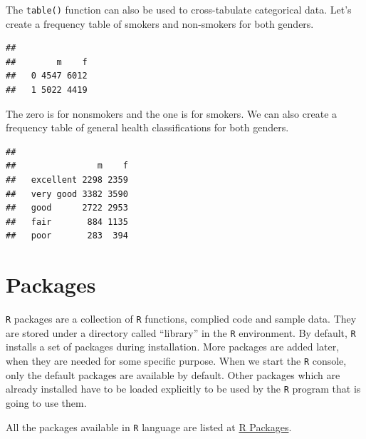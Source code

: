 \documentclass[
]{book}
\newenvironment{Shaded}{\begin{snugshade}}{\end{snugshade}}
\newcommand{\KeywordTok}[1]{\textcolor[rgb]{0.13,0.29,0.53}{\textbf{#1}}}
\newcommand{\NormalTok}[1]{#1}
\newcommand{\OperatorTok}[1]{\textcolor[rgb]{0.81,0.36,0.00}{\textbf{#1}}}
\begin{document}
The \texttt{table()} function can also be used to cross-tabulate categorical data. Let's create a frequency table of smokers and non-smokers for both genders.

\begin{Shaded}
\end{Shaded}

\begin{verbatim}
##    
##        m    f
##   0 4547 6012
##   1 5022 4419
\end{verbatim}

The zero is for nonsmokers and the one is for smokers. We can also create a frequency table of general health classifications for both genders.

\begin{Shaded}
\end{Shaded}

\begin{verbatim}
##            
##                m    f
##   excellent 2298 2359
##   very good 3382 3590
##   good      2722 2953
##   fair       884 1135
##   poor       283  394
\end{verbatim}

\hypertarget{packages}{%
\chapter{Packages}\label{packages}}

\texttt{R} packages are a collection of \texttt{R} functions, complied code and sample data. They are stored under a directory called ``library'' in the \texttt{R} environment. By default, \texttt{R} installs a set of packages during installation. More packages are added later, when they are needed for some specific purpose. When we start the \texttt{R} console, only the default packages are available by default. Other packages which are already installed have to be loaded explicitly to be used by the \texttt{R} program that is going to use them.

All the packages available in \texttt{R} language are listed at \href{https://cran.r-project.org/web/packages/available_packages_by_name.html}{R Packages}.
\end{document}
